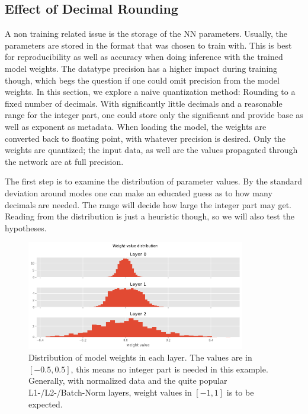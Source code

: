 \documentclass[11pt]{article}
\begin{document}
\subsection*{Effect of Decimal Rounding}

A non training related issue is the storage of the NN parameters. Usually, the parameters
are stored in the format that was chosen to train with. This is best for reproducibility
as well as accuracy when doing inference with the trained model weights. The datatype  
precision has a higher impact during training though, which begs the question if one could
omit precision from the model weights. In this section, we explore a naive quantization
method: Rounding to a fixed number of decimals. With significantly little decimals and a
reasonable range for the integer part, one could store only the significant and provide
base as well as exponent as metadata. When loading the model, the weights are converted
back to floating point, with whatever precision is desired. Only the weights are quantized;
the input data, as well are the values propagated through the network are at full
precision.

The first step is to examine the distribution of parameter values. By the standard
deviation around modes one can make an educated guess as to how many decimals are needed.
The range will decide how large the integer part may get. Reading from the 
distribution is just a heuristic though, so we will also test the hypotheses.


\begin{figure}[H]
	\centering
	\includegraphics[width=0.85\textwidth]{figures/118_dist.png}
	\caption{
		Distribution of model weights in each layer. The values are in $[-0.5, 0.5]$,
		this means no integer part is needed in this example. Generally, with normalized data
		and the quite popular L1-/L2-/Batch-Norm layers, weight values in $[-1, 1]$ is to be expected.}
\end{figure}
\end{document}
